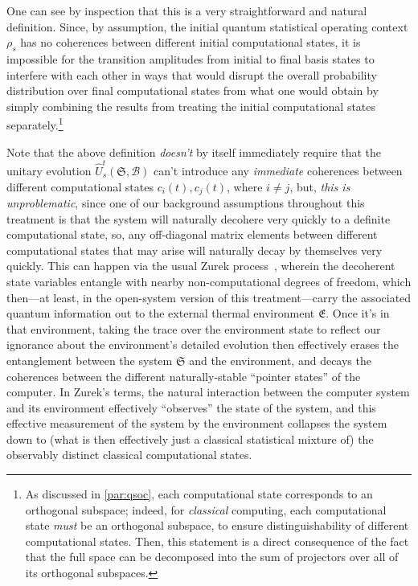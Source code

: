 \documentclass[preprints,article,accept,moreauthors,pdftex]{Definitions/mdpi}
\begin{document}
\begin{paracol}{2}
One can see by inspection that this is a very straightforward and natural definition. Since, by assumption, the initial quantum statistical operating context $\rho_s$ has no coherences between different initial computational states, it is impossible for the transition amplitudes from initial to final basis states to interfere with each other in ways that would disrupt the overall probability distribution over final computational states from what one would obtain by simply combining the results from treating the initial computational states separately.\footnote{As discussed in \ref{par:qsoc}, each computational state corresponds to an orthogonal subspace; indeed, for \emph{classical} computing, each computational state \emph{must} be an orthogonal subspace, to 
ensure distinguishability of %
different computational states. Then, this statement is a direct consequence of the fact that the full space can be decomposed into the sum of projectors over all of its orthogonal subspaces.}

Note that the above definition \emph{doesn't} by itself immediately require that the unitary evolution $\widehat{U}_s^t(\mathfrak{S},\boldsymbol{\mathcal{B}})$ can't introduce any \emph{immediate} coherences between different computational states $c_i(t),c_j(t)$, where $i\neq j$, but, \emph{this is unproblematic}, since one of our background assumptions throughout this treatment is that the system will naturally decohere very quickly to a definite computational state, so, any off-diagonal matrix elements between different computational states that may arise will naturally decay by themselves very quickly. This can happen via the usual Zurek process~\cite{Zur03}, wherein the decoherent state variables entangle with nearby non-computational degrees of freedom, which then---at least, in the open-system version of this treatment---carry the associated quantum information out to the external thermal environment $\mathfrak{E}$. Once it's in that environment, taking the trace over the environment state to reflect our ignorance about the environment's detailed evolution then effectively erases the entanglement between the system $\mathfrak{S}$ and the environment, and decays the coherences between the different naturally-stable ``pointer states'' of the computer. In Zurek's terms, the natural interaction between the computer system and its environment effectively ``observes'' the state of the system, and this effective measurement of the system by the environment collapses the system down to (what is then effectively just a classical statistical mixture of) the observably distinct classical computational states.


\end{paracol}
\end{document}
